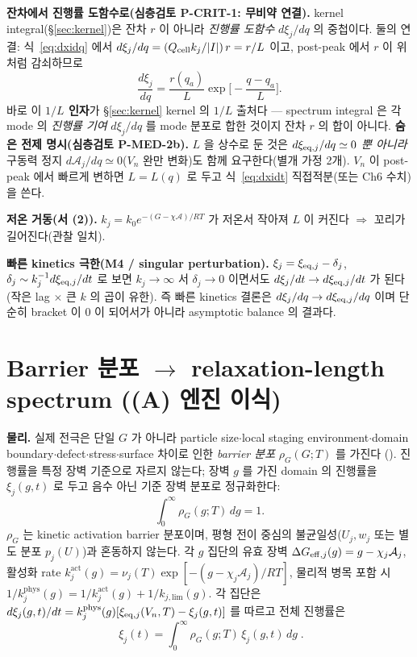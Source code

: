 \textbf{잔차에서 진행률 도함수로(심층검토 P-CRIT-1: 무비약 연결).} kernel integral(\S\ref{sec:kernel})은
잔차 $r$ 이 아니라 \emph{진행률 도함수} $d\xi_j/dq$ 의 중첩이다. 둘의 연결: 식~\eqref{eq:dxidq} 에서
$d\xi_j/dq=(Q_{\mathrm{cell}} k_j/|I|)\,r=r/L$ 이고, post-peak 에서 $r$ 이 위처럼 감쇠하므로
\begin{equation}
\frac{d\xi_j}{dq}=\frac{r(q_a)}{L}\exp\!\Big[-\frac{q-q_a}{L}\Big].
\label{eq:single_dxidq}
\end{equation}
바로 이 \textbf{$1/L$ 인자}가 \S\ref{sec:kernel} kernel 의 $1/L$ 출처다 — spectrum integral 은 각 mode 의
\emph{진행률 기여} $d\xi_j/dq$ 를 mode 분포로 합한 것이지 잔차 $r$ 의 합이 아니다.
\textbf{숨은 전제 명시(심층검토 P-MED-2b).} $L$ 을 상수로 둔 것은 $d\xi_{\mathrm{eq},j}/dq\simeq0$ \emph{뿐 아니라}
구동력 정지 $d\mathcal A_j/dq\simeq0$($V_n$ 완만 변화)도 함께 요구한다(별개 가정 2개). $V_n$ 이 post-peak
에서 빠르게 변하면 $L=L(q)$ 로 두고 식~\eqref{eq:dxidt} 직접적분(또는 Ch6 수치)을 쓴다.

\textbf{저온 거동(서 (2)).} $k_j=k_0e^{-(G-\chi\mathcal A)/RT}$ 가 저온서 작아져 $L$ 이 커진다
$\Rightarrow$ 꼬리가 길어진다(관찰 일치).

\textbf{빠른 kinetics 극한(M4 / singular perturbation).} $\xi_j=\xi_{\mathrm{eq},j}-\delta_j$,
$\delta_j\sim k_j^{-1}d\xi_{\mathrm{eq},j}/dt$ 로 보면 $k_j\to\infty$ 서 $\delta_j\to0$ 이면서도
$d\xi_j/dt\to d\xi_{\mathrm{eq},j}/dt$ 가 된다(작은 lag $\times$ 큰 $k$ 의 곱이 유한). 즉 빠른 kinetics 결론은
$d\xi_j/dq\to d\xi_{\mathrm{eq},j}/dq$ 이며 단순히 bracket 이 0 이 되어서가 아니라 asymptotic balance 의 결과다.

\section{Barrier 분포 $\to$ relaxation-length spectrum ((A) 엔진 이식)}\label{sec:spectrum}
\textbf{물리.} 실제 전극은 단일 $G$ 가 아니라 particle size$\cdot$local staging environment$\cdot$domain
boundary$\cdot$defect$\cdot$stress$\cdot$surface 차이로 인한 \emph{barrier 분포} $\rho_G(G;T)$ 를 가진다
(). 진행률을 특정 장벽 기준으로 자르지 않는다; 장벽 $g$ 를 가진 domain 의 진행률을 $\xi_j(g,t)$ 로
두고 음수 아닌 기준 장벽 분포로 정규화한다:
\begin{equation}
\int_0^\infty \rho_G(g;T)\,dg=1.
\label{eq:rho_norm}
\end{equation}
$\rho_G$ 는 kinetic activation barrier 분포이며, 평형 전이 중심의 불균일성($U_j,w_j$ 또는 별도 분포
$p_j(U)$)과 혼동하지 않는다. 각 $g$ 집단의 유효 장벽 $\Delta G_{\mathrm{eff},j}(g)=g-\chi_j\mathcal A_j$, 활성화
rate $k_j^\mathrm{act}(g)=\nu_j(T)\exp[-(g-\chi_j\mathcal A_j)/RT]$, 물리적 병목 포함 시
$1/k_j^\mathrm{phys}(g)=1/k_j^\mathrm{act}(g)+1/k_{j,\mathrm{lim}}(g)$. 각 집단은
$d\xi_j(g,t)/dt=k_j^\mathrm{phys}(g)[\xi_{\mathrm{eq},j}(V_n,T)-\xi_j(g,t)]$ 를 따르고 전체 진행률은
\begin{equation}
\boxed{\;\xi_j(t)=\int_0^\infty \rho_G(g;T)\,\xi_j(g,t)\,dg\;.}
\label{eq:xi_dist}
\end{equation}

